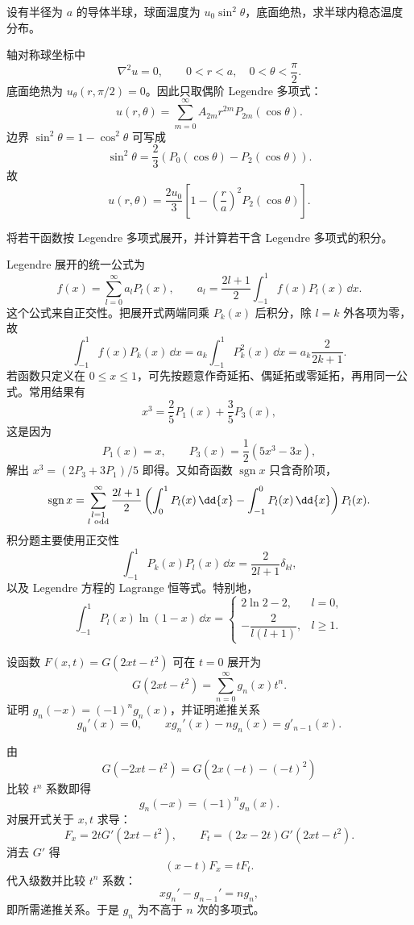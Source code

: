 ﻿


\begin{question}
设有半径为 \(a\) 的导体半球，球面温度为 \(u_0\sin^2\theta\)，底面绝热，求半球内稳态温度分布。
\begin{solution}
轴对称球坐标中
\[
\nabla^2u=0,\qquad 0<r<a,\quad 0<\theta<\frac\pi2.
\]
底面绝热为 \(u_\theta(r,\pi/2)=0\)。因此只取偶阶 Legendre 多项式：
\[
u(r,\theta)=\sum_{m=0}^{\infty}A_{2m}r^{2m}P_{2m}(\cos\theta).
\]
边界 \(\sin^2\theta=1-\cos^2\theta\) 可写成
\[
\sin^2\theta=\frac23\left(P_0(\cos\theta)-P_2(\cos\theta)\right).
\]
故
\[
u(r,\theta)=\frac{2u_0}{3}
\left[1-\left(\frac ra\right)^2P_2(\cos\theta)\right].
\]
\end{solution}
\end{question}

\begin{question}
将若干函数按 Legendre 多项式展开，并计算若干含 Legendre 多项式的积分。
\begin{solution}
Legendre 展开的统一公式为
\[
f(x)=\sum_{l=0}^{\infty}a_lP_l(x),\qquad
a_l=\frac{2l+1}{2}\int_{-1}^{1}f(x)P_l(x)\,\dd{x}.
\]
这个公式来自正交性。把展开式两端同乘 \(P_k(x)\) 后积分，除 \(l=k\) 外各项为零，故
\[
\int_{-1}^{1}f(x)P_k(x)\,\dd{x}
=a_k\int_{-1}^{1}P_k^2(x)\,\dd{x}
=a_k\frac{2}{2k+1}.
\]
若函数只定义在 \(0\le x\le1\)，可先按题意作奇延拓、偶延拓或零延拓，再用同一公式。常用结果有
\[
x^3=\frac25P_1(x)+\frac35P_3(x),
\]
这是因为
\[
P_1(x)=x,\qquad P_3(x)=\frac12(5x^3-3x),
\]
解出 \(x^3=(2P_3+3P_1)/5\) 即得。又如奇函数 \(\operatorname{sgn}x\) 只含奇阶项，
\[
\operatorname{sgn}x=\sum_{\substack{l=1\\ l\ {\rm odd}}}^{\infty}
\frac{2l+1}{2}\left(\int_0^1P_l(x)\,\dd{x}-\int_{-1}^0P_l(x)\,\dd{x}\right)P_l(x).
\]
积分题主要使用正交性
\[
\int_{-1}^{1}P_k(x)P_l(x)\,\dd{x}=\frac{2}{2l+1}\delta_{kl},
\]
以及 Legendre 方程的 Lagrange 恒等式。特别地，
\[
\int_{-1}^{1}P_l(x)\ln(1-x)\,\dd{x}
=
\begin{cases}
2\ln2-2,&l=0,\\
-\dfrac{2}{l(l+1)},&l\ge1.
\end{cases}
\]
\end{solution}
\end{question}

\begin{question}
设函数 \(F(x,t)=G(2xt-t^2)\) 可在 \(t=0\) 展开为
\[
G(2xt-t^2)=\sum_{n=0}^{\infty}g_n(x)t^n.
\]
证明 \(g_n(-x)=(-1)^ng_n(x)\)，并证明递推关系
\[
g_0'(x)=0,\qquad xg_n'(x)-ng_n(x)=g'_{n-1}(x).
\]
\begin{solution}
由
\[
G(-2xt-t^2)=G(2x(-t)-(-t)^2)
\]
比较 \(t^n\) 系数即得
\[
g_n(-x)=(-1)^ng_n(x).
\]
对展开式关于 \(x,t\) 求导：
\[
F_x=2tG'(2xt-t^2),\qquad
F_t=(2x-2t)G'(2xt-t^2).
\]
消去 \(G'\) 得
\[
(x-t)F_x=tF_t.
\]
代入级数并比较 \(t^n\) 系数：
\[
xg_n'-g_{n-1}'=ng_n,
\]
即所需递推关系。于是 \(g_n\) 为不高于 \(n\) 次的多项式。
\end{solution}
\end{question}


